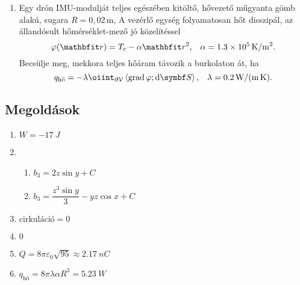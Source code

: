\documentclass{szb-practice}
\begin{document}
\begin{enumerate}
  \item Egy drón IMU-modulját teljes egészében kitöltő, hővezető műgyanta gömb
        alakú, sugara $R = 0,02 \, \text{m}$, A vezérlő egység folyamatosan
        hőt disszipál, az állandósult hő\-mér\-sék\-let-mező jó közelítéssel
        $$
          \varphi(\coordv) = T_c - \alpha \rvec r^2
          \text, \quad
          \alpha = \SI[per-mode=symbol]{1,3e5}{\kelvin\per\meter\squared}
          \text.
        $$
        Becsülje meg, mekkora teljes hőáram távozik a burkolaton át, ha
        $$
          q_{\text{hő}}
          = -\lambda \oiint_{\partial \volimage} \scalar{\grad \varphi}{\dd \surfvec}
          \text,\quad
          \lambda = \SI[per-mode=symbol]{0,2}{\watt\per\meter\per\kelvin}
          \text.
        $$
\end{enumerate}

\vfill
\subsection{Megoldások}

\begin{enumerate}
  \item $W = \SI{-17}{J}$
  \item \begin{enumerate}
          \item $b_3 = 2 z \sin y + C$
          \item $b_3 = \dfrac{z^3 \sin y}{3} - y z \cos x + C$
        \end{enumerate}
  \item $\text{cirkuláció} = 0$
  \item $0$
  \item $Q = 8\pi\varepsilon_0\sqrt{95} \approx \SI{2,17}{nC}$
  \item $q_\text{hő} = 8\pi\lambda\alpha R^3 = \SI{5,23}{W}$
\end{enumerate}
\end{document}
